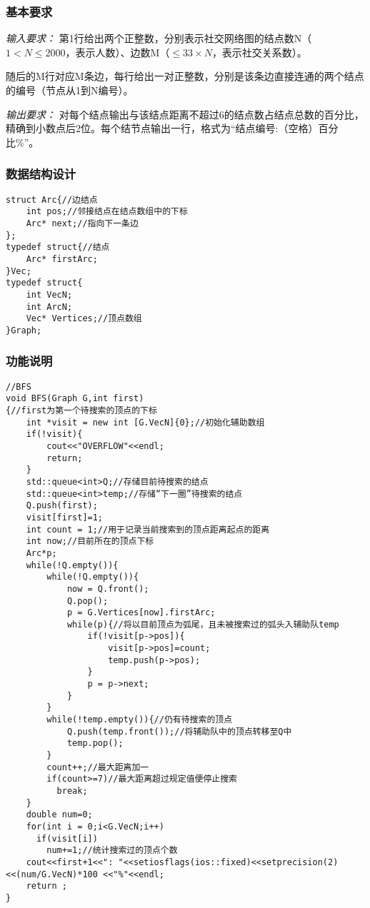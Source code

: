\documentclass[a4paper,11pt]{article}%
\newenvironment{shadedquotation}
 {\begin{shaded*}
  \quoting[leftmargin=0pt, vskip=0pt]
 }
 {\endquoting
 \end{shaded*}
}
\begin{document}
\subsubsection{基本要求}
\begin{shadedquotation}
    \emph{输入要求：}
    第1行给出两个正整数，分别表示社交网络图的结点数N（$1<N\leq 2000$​​，表示人数）、边数M（$\leq 33×N$，表示社交关系数）。

    随后的M行对应M条边，每行给出一对正整数，分别是该条边直接连通的两个结点的编号（节点从1到N编号）。
\end{shadedquotation}
\begin{shadedquotation}
    \emph{输出要求：}
    对每个结点输出与该结点距离不超过6的结点数占结点总数的百分比，精确到小数点后2位。每个结节点输出一行，格式为“结点编号:（空格）百分比\%”。
\end{shadedquotation}
\subsubsection{数据结构设计}
\begin{lstlisting}[language={[ANSI]C},keywordstyle=\color{blue!70},commentstyle=\color{red!50!green!50!blue!50},frame=shadowbox,
				rulesepcolor=\color{red!20!green!20!blue!20}]
struct Arc{//边结点
	int pos;//邻接结点在结点数组中的下标
	Arc* next;//指向下一条边
};
typedef struct{//结点
	Arc* firstArc;	
}Vec;
typedef struct{
	int VecN;
	int ArcN;
	Vec* Vertices;//顶点数组
}Graph;
\end{lstlisting}
\subsubsection{功能说明}
\begin{lstlisting}[language={[ANSI]C},keywordstyle=\color{blue!70},commentstyle=\color{red!50!green!50!blue!50},frame=shadowbox,
    rulesepcolor=\color{red!20!green!20!blue!20}]
//BFS
void BFS(Graph G,int first)
{//first为第一个待搜索的顶点的下标
	int *visit = new int [G.VecN]{0};//初始化辅助数组
	if(!visit){
		cout<<"OVERFLOW"<<endl;
		return;
	}
	std::queue<int>Q;//存储目前待搜索的结点
	std::queue<int>temp;//存储“下一圈”待搜索的结点
	Q.push(first);
	visit[first]=1;
	int count = 1;//用于记录当前搜索到的顶点距离起点的距离
	int now;//目前所在的顶点下标
	Arc*p;
	while(!Q.empty()){
		while(!Q.empty()){
			now = Q.front();
			Q.pop();
			p = G.Vertices[now].firstArc;
			while(p){//将以目前顶点为弧尾，且未被搜索过的弧头入辅助队temp
				if(!visit[p->pos]){
					visit[p->pos]=count;
					temp.push(p->pos);
				}
				p = p->next;
			}
		}
		while(!temp.empty()){//仍有待搜索的顶点
			Q.push(temp.front());//将辅助队中的顶点转移至Q中
			temp.pop();
		}
		count++;//最大距离加一
		if(count>=7)//最大距离超过规定值便停止搜索
		  break;
	}
	double num=0;
	for(int i = 0;i<G.VecN;i++)
	  if(visit[i])
		num+=1;//统计搜索过的顶点个数
	cout<<first+1<<": "<<setiosflags(ios::fixed)<<setprecision(2)<<(num/G.VecN)*100 <<"%"<<endl;
	return ;
}    
\end{lstlisting}
\end{document}
